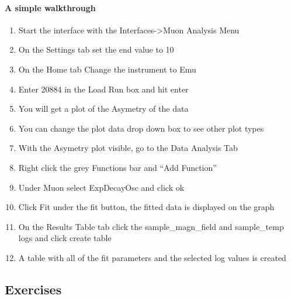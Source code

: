 \documentclass[letterpaper,10pt,english,openany]{sphinxmanual}
\begin{document}
\paragraph{A simple walkthrough}
\label{\detokenize{mantid_basic_course/algorithms_workspaces_and_histories/05_interfaces:a-simple-walkthrough}}\begin{enumerate}
\def\theenumi{\arabic{enumi}}
\def\labelenumi{\theenumi .}
\makeatletter\def\p@enumii{\p@enumi \theenumi .}\makeatother
\item {} 
Start the interface with the Interfaces-\textgreater{}Muon Analysis Menu

\item {} 
On the Settings tab set the end value to 10

\item {} 
On the Home tab Change the instrument to Emu

\item {} 
Enter 20884 in the Load Run box and hit enter

\item {} 
You will get a plot of the Asymetry of the data

\item {} 
You can change the plot data drop down box to see other plot types

\item {} 
With the Asymetry plot visible, go to the Data Analysis Tab

\item {} 
Right click the grey Functions bar and “Add Function”

\item {} 
Under Muon select ExpDecayOsc and click ok

\item {} 
Click Fit under the fit button, the fitted data is displayed on the
graph

\item {} 
On the Results Table tab click the sample\_magn\_field and sample\_temp
logs and click create table

\item {} 
A table with all of the fit parameters and the selected log values is
created

\end{enumerate}




\subsection{Exercises}
\label{\detokenize{mantid_basic_course/algorithms_workspaces_and_histories/06_exercises_a:exercises}}\label{\detokenize{mantid_basic_course/algorithms_workspaces_and_histories/06_exercises_a:exercises-a}}\label{\detokenize{mantid_basic_course/algorithms_workspaces_and_histories/06_exercises_a::doc}}
\end{document}

